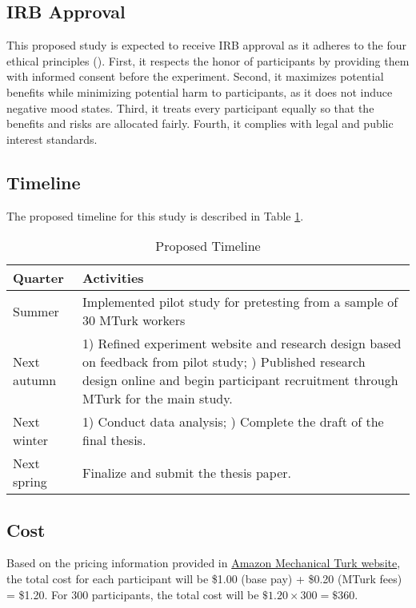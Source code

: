 \documentclass[../Proposal.tex]{subfiles}
\begin{document}
\subsection*{IRB Approval}
This proposed study is expected to receive IRB approval as it adheres to the four ethical principles (\cite{salganik_bit_2019}). First, it respects the honor of participants by providing them with informed consent before the experiment. Second, it maximizes potential benefits while minimizing potential harm to participants, as it does not induce negative mood states. Third, it treats every participant equally so that the benefits and risks are allocated fairly. Fourth, it complies with legal and public interest standards.

\subsection*{Timeline}
The proposed timeline for this study is described in Table \ref{tab: Proposed Timeline}.
\begin{table}
\centering
\begin{tabular}{|l|p{8cm}|}
\hline
\textbf{Quarter} & \textbf{Activities} \\
\hline
Summer & Implemented pilot study for pretesting from a sample of 30 MTurk workers \\
\hline
Next autumn & 1) Refined experiment website and research design based on feedback from pilot study; \newline 2) Published research design online and begin participant recruitment through MTurk for the main study. \\
\hline
Next winter & 1) Conduct data analysis; \newline 2) Complete the draft of the final thesis. \\
\hline
Next spring & Finalize and submit the thesis paper. \\
\hline
\end{tabular}
\caption{Proposed Timeline}
\label{tab: Proposed Timeline}
\end{table}

\subsection*{Cost}
Based on the pricing information provided in \href{https://requester.mturk.com/pricing}{Amazon Mechanical Turk website}, the total cost for each participant will be \$1.00 (base pay) + \$0.20 (MTurk fees) = \$1.20. For 300 participants, the total cost will be $\$1.20 \times 300 = \$360$.
\end{document}
